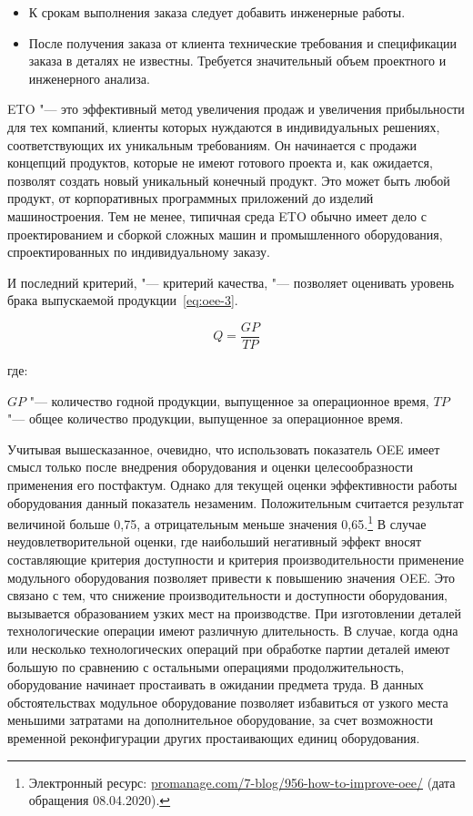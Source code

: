 \begin{itemize}
	\item К срокам выполнения заказа следует добавить инженерные работы.
	\item После получения заказа от клиента технические требования и спецификации заказа в деталях не известны. Требуется значительный объем проектного и инженерного анализа.
\end{itemize}

ETO "--- это эффективный метод увеличения продаж и увеличения прибыльности для тех компаний, клиенты которых нуждаются в индивидуальных решениях, соответствующих их уникальным требованиям. Он начинается с продажи концепций продуктов, которые не имеют готового проекта и, как ожидается, позволят создать новый уникальный конечный продукт. Это может быть любой продукт, от корпоративных программных приложений до изделий машиностроения. Тем не менее, типичная среда ETO обычно имеет дело с проектированием и сборкой сложных машин и промышленного оборудования, спроектированных по индивидуальному заказу.

И последний критерий, "--- критерий качества, "--- позволяет оценивать уровень брака выпускаемой продукции~\cref{eq:oee-3}.

\begin{equation}
	Q = \frac{GP}{TP}
	\label{eq:oee-3}
\end{equation}

\noindent где:

\noindent $GP$ "--- количество годной продукции, выпущенное за операционное время,
\noindent $TP$ "--- общее количество продукции, выпущенное за операционное время.

Учитывая вышесказанное, очевидно, что использовать показатель OEE имеет смысл только после внедрения оборудования и оценки целесообразности применения его постфактум. Однако для текущей оценки эффективности работы оборудования данный показатель незаменим. Положительным считается результат величиной больше 0,75, а отрицательным меньше значения 0,65.\footnote{Электронный ресурс: \url{promanage.com/7-blog/956-how-to-improve-oee/} (дата обращения 08.04.2020).} В случае неудовлетворительной оценки, где наибольший негативный эффект вносят составляющие критерия доступности и критерия производительности применение модульного оборудования позволяет привести к повышению значения OEE. Это связано с тем, что снижение производительности и доступности оборудования, вызывается образованием узких мест на производстве. При изготовлении деталей технологические операции имеют различную длительность. В случае, когда одна или несколько технологических операций при обработке партии деталей имеют большую по сравнению с остальными операциями продолжительность, оборудование начинает простаивать в ожидании предмета труда. В данных обстоятельствах модульное оборудование позволяет избавиться от узкого места меньшими затратами на дополнительное оборудование, за счет возможности временной реконфигурации других простаивающих единиц оборудования. 

